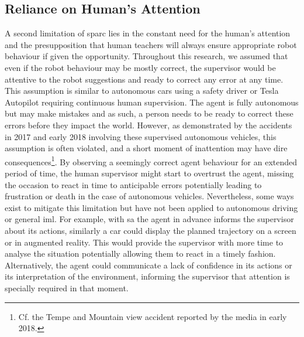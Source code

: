 \subsection{Reliance on Human's Attention}
A second limitation of \gls{sparc} lies in the constant need for the human's attention and the presupposition that human teachers will always ensure  appropriate robot behaviour if given the opportunity. Throughout this research, we assumed that even if the robot behaviour may be mostly correct, the supervisor would be attentive to the robot suggestions and ready to correct any error at any time. This assumption is similar to autonomous cars using a safety driver or Tesla Autopilot requiring continuous human supervision. The agent is fully autonomous but may make mistakes and as such, a person needs to be ready to correct these errors before they impact the world. However, as demonstrated by the accidents in 2017 and early 2018 involving these supervised autonomous vehicles, this assumption is often violated, and a short moment of inattention may have dire consequences\footnote{Cf. the Tempe and Mountain view accident reported by the media in early 2018.\label{foot:disc_danger}}. By observing a seemingly correct agent behaviour for an extended period of time, the human supervisor might start to overtrust the agent, missing the occasion to react in time to anticipable errors potentially leading to frustration or death in the case of autonomous vehicles. Nevertheless, some ways exist to mitigate this limitation but have not been applied to autonomous driving or general \gls{iml}. For example, with \gls{sa} the agent in advance informs the supervisor about its actions, similarly a car could display the planned trajectory on a screen or in augmented reality. This would provide the supervisor with more time to analyse the situation potentially allowing them to react in a timely fashion. Alternatively, the agent could communicate a lack of confidence in its actions or its interpretation of the environment, informing the supervisor that attention is specially required in that moment.

